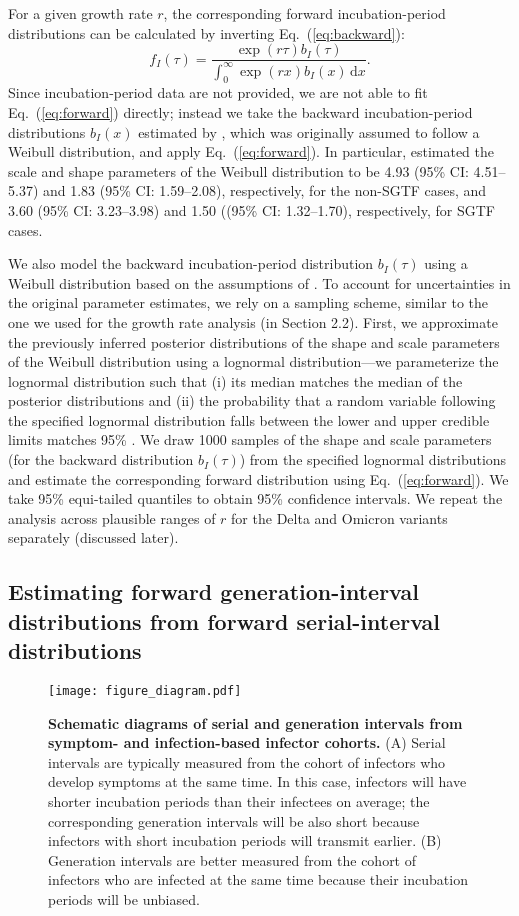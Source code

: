 \documentclass[12pt]{article}
\newcommand{\eref}[1]{Eq.~(\ref{eq:#1})}
\newcommand{\dd}[1]{\ensuremath{\, \mathrm{d}#1}}
\newcommand{\dx}{\dd{x}}
\begin{document}
For a given growth rate $r$, the corresponding forward incubation-period distributions can be calculated by inverting \eref{backward}:
\begin{equation}
f_I(\tau) = \frac{\exp(r\tau) b_I(\tau) }{\int_0^\infty \exp(rx) b_I(x)\dx}.
\label{eq:forward}
\end{equation}
Since incubation-period data are not provided, we are not able to fit \eref{forward} directly; 
instead we take the backward incubation-period distributions $b_I(x)$ estimated by \cite{backer2021omicron}, which was originally assumed to follow a Weibull distribution, and apply \eref{forward}.
In particular, \cite{backer2021omicron} estimated the scale and shape parameters of the Weibull distribution to be 4.93 (95\% CI: 4.51--5.37) and 1.83 (95\% CI: 1.59--2.08), respectively, for the non-SGTF cases, and 3.60 (95\% CI: 3.23--3.98) and 1.50 ((95\% CI: 1.32--1.70), respectively, for SGTF cases.

We also model the backward incubation-period distribution $b_I(\tau)$ using a Weibull distribution based on the assumptions of \cite{backer2021omicron}.
To account for uncertainties in the original parameter estimates, we rely on a sampling scheme, similar to the one we used for the growth rate analysis (in Section 2.2).
First, we approximate the previously inferred posterior distributions of the shape and scale parameters of the Weibull distribution using a lognormal distribution---we parameterize the lognormal distribution such that (i) its median matches the median of the posterior distributions and (ii) the probability that a random variable following the specified lognormal distribution falls between the lower and upper credible limits matches 95\% \citep{park2020reconciling}.
We draw 1000 samples of the shape and scale parameters (for the backward distribution $b_I(\tau)$) from the specified lognormal distributions and estimate the corresponding forward distribution using \eref{forward}.
We take 95\% equi-tailed quantiles to obtain 95\% confidence intervals.
We repeat the analysis across plausible ranges of $r$ for the Delta and Omicron variants separately (discussed later).

\subsection{Estimating forward generation-interval distributions from forward serial-interval distributions}

\begin{figure}[!tp]
\texttt{[image: figure\_diagram.pdf]}
\caption{
\textbf{Schematic diagrams of serial and generation intervals from symptom- and infection-based infector cohorts.}
(A) Serial intervals are typically measured from the cohort of infectors who develop symptoms at the same time. 
In this case, infectors will have shorter incubation periods than their infectees on average; the corresponding generation intervals will be also short because infectors with short incubation periods will transmit earlier.
(B) Generation intervals are better measured from the cohort of infectors who are infected at the same time because their incubation periods will be unbiased.
\label{fig:diagram}
}
\end{figure}
\end{document}
